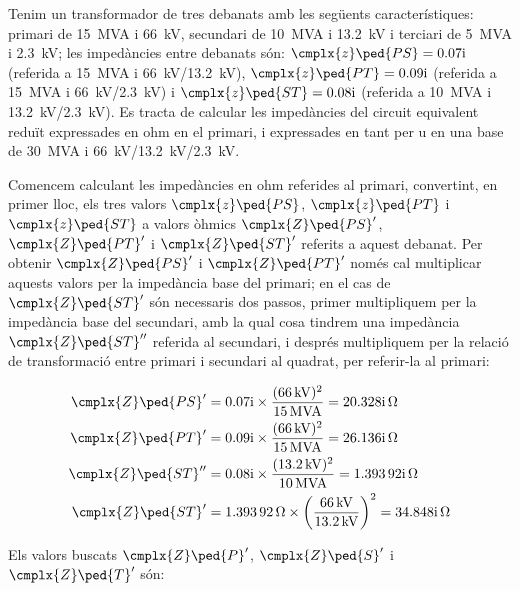	
\begin{exemple}[\ImpCircEqTrafoTresDeb{}]
	\addcontentsxms{\ImpCircEqTrafoTresDeb}
    Tenim un transformador de tres debanats amb les següents característiques: primari de \qty{15}{MVA} i \qty{66}{kV}, secundari de \qty{10}{MVA} i \qty{13,2}{kV} i terciari de \qty{5}{MVA} i \qty{2,3}{kV}; les impedàncies entre debanats són: $\cmplx{z}\ped{PS} = \complexnum{j 0,07}$ (referida a \qty{15}{MVA} i \qty{66}{kV}/\qty{13,2}{kV}), $\cmplx{z}\ped{PT} = \complexnum{j 0,09}$ (referida a \qty{15}{MVA} i \qty{66}{kV}/\qty{2,3}{kV}) i $\cmplx{z}\ped{ST} = \complexnum{j 0,08}$ (referida a \qty{10}{MVA} i \qty{13,2}{kV}/\qty{2,3}{kV}).  Es tracta de calcular les impedàncies del circuit equivalent reduït expressades en ohm en el primari, i expressades en tant per u en una base de \qty{30}{MVA} i \qty{66}{kV}/\qty{13,2}{kV}/\qty{2,3}{kV}.

    Comencem calculant les impedàncies en ohm referides al primari, convertint, en primer lloc, els tres valors $\cmplx{z}\ped{PS}$, $\cmplx{z}\ped{PT}$ i $\cmplx{z}\ped{ST}$ a valors òhmics $\cmplx{Z}\ped{PS}'$, $\cmplx{Z}\ped{PT}'$ i $\cmplx{Z}\ped{ST}'$ referits a aquest debanat. Per obtenir $\cmplx{Z}\ped{PS}'$ i $\cmplx{Z}\ped{PT}'$ només cal multiplicar aquests valors per la impedància base del primari; en el cas de $\cmplx{Z}\ped{ST}'$ són necessaris dos passos, primer multipliquem per la impedància base del secundari, amb la qual cosa tindrem una impedància $\cmplx{Z}\ped{ST}''$ referida al secundari,  i després multipliquem per la relació de transformació entre primari i secundari al quadrat, per  referir-la al primari:

    \begin{align*}
        \cmplx{Z}\ped{PS}' &=  \complexnum{j 0,07} \times \frac{(\qty{66}{kV})^2}{\qty{15}{MVA}} = \complexqty{j 20,328}{\ohm}\\
        \cmplx{Z}\ped{PT}' &=  \complexnum{j 0,09} \times \frac{(\qty{66}{kV})^2}{\qty{15}{MVA}} = \complexqty{j 26,136}{\ohm}\\
        \cmplx{Z}\ped{ST}'' &= \complexnum{j 0,08} \times \frac{(\qty{13,2}{kV})^2}{\qty{10}{MVA}} = \complexqty{j 1,39392}{\ohm}\\
        \cmplx{Z}\ped{ST}' &=  \qty{1,39392}{\ohm} \times {\left(\frac{\qty{66}{kV}}{\qty{13,2}{kV}}\right)}^2 = \complexqty{j 34,848}{\ohm}
    \end{align*}

    Els valors buscats $\cmplx{Z}\ped{P}'$, $\cmplx{Z}\ped{S}'$ i $\cmplx{Z}\ped{T}'$ són:


\end{exemple}
